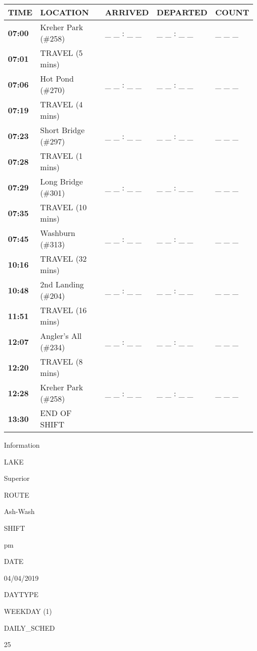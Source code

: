 \documentclass[]{article}
\begin{document}
\begin{tabular}{>{\bfseries}lllll}
\toprule
\textbf{TIME} & \textbf{LOCATION} & \textbf{ARRIVED} & \textbf{DEPARTED} & \textbf{COUNT}\\
\midrule
07:00 & Kreher Park (\#258) & \_ \_ : \_ \_ & \_ \_ : \_ \_ & \_ \_ \_\\
07:01 & TRAVEL (5 mins) &  &  & \\
07:06 & Hot Pond (\#270) & \_ \_ : \_ \_ & \_ \_ : \_ \_ & \_ \_ \_\\
07:19 & TRAVEL (4 mins) &  &  & \\
07:23 & Short Bridge (\#297) & \_ \_ : \_ \_ & \_ \_ : \_ \_ & \_ \_ \_\\
07:28 & TRAVEL (1 mins) &  &  & \\
07:29 & Long Bridge (\#301) & \_ \_ : \_ \_ & \_ \_ : \_ \_ & \_ \_ \_\\
07:35 & TRAVEL (10 mins) &  &  & \\
07:45 & Washburn (\#313) & \_ \_ : \_ \_ & \_ \_ : \_ \_ & \_ \_ \_\\
10:16 & TRAVEL (32 mins) &  &  & \\
10:48 & 2nd Landing (\#204) & \_ \_ : \_ \_ & \_ \_ : \_ \_ & \_ \_ \_\\
11:51 & TRAVEL (16 mins) &  &  & \\
12:07 & Angler's All (\#234) & \_ \_ : \_ \_ & \_ \_ : \_ \_ & \_ \_ \_\\
12:20 & TRAVEL (8 mins) &  &  & \\
12:28 & Kreher Park (\#258) & \_ \_ : \_ \_ & \_ \_ : \_ \_ & \_ \_ \_\\
13:30 & END OF SHIFT &  &  & \\
\bottomrule
\end{tabular}\newpage

Information

LAKE

Superior

ROUTE

Ash-Wash

SHIFT

pm

DATE

04/04/2019

DAYTYPE

WEEKDAY (1)

DAILY\_SCHED

25

\vspace{24pt}
\end{document}
